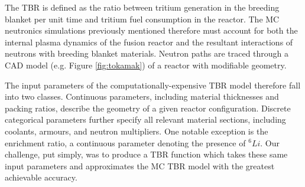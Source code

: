 The TBR is defined as the ratio between tritium generation in the breeding blanket per unit time and tritium fuel consumption in the reactor. The MC neutronics simulations previously mentioned therefore must account for both the internal plasma dynamics of the fusion reactor and the resultant interactions of neutrons with breeding blanket materials. Neutron paths are traced through a CAD model (e.g. Figure \ref{fig:tokamak}) of a reactor with modifiable geometry.

The input parameters of the computationally-expensive TBR model therefore fall into two classes. Continuous parameters, including material thicknesses and packing ratios, describe the geometry of a given reactor configuration. Discrete categorical parameters further specify all relevant material sections, including coolants, armours, and neutron multipliers. One notable exception is the enrichment ratio, a continuous parameter denoting the presence of $^6Li$. Our challenge, put simply, was to produce a TBR function which takes these same input parameters and approximates the MC TBR model with the greatest achievable accuracy.
    



